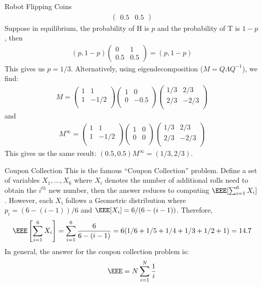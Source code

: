 \documentclass[oldfontcommands]{memoir}
\begin{document}
{\begin{answer}{Robot Flipping Coins}
\begin{align*}
\begin{pmatrix}
        0.5 & 0.5
    \end{pmatrix}	
\end{align*}
Suppose in equilibrium, the probability of H is $p$ and the probability of T is $1-p$, then
\begin{align*}
    (p, 1-p) 
    \begin{pmatrix}
        0 & 1\\
        0.5 & 0.5
    \end{pmatrix}
    =
    (p, 1-p)
\end{align*}
This gives us $p = 1/3$. Alternatively, using eigendecomposition ($M = Q \Lambda Q^{-1}$), we find:
\begin{align*}
    M = 
    \begin{pmatrix}
    1 & 1\\
    1 & -1/2\\		
    \end{pmatrix}
    \begin{pmatrix}
    1 & 0\\
    0 & -0.5\\		
    \end{pmatrix}
    \begin{pmatrix}
    1/3 & 2/3\\
    2/3 & -2/3\\		
    \end{pmatrix}
\end{align*}
and 
\begin{align*}
    M^\infty = 
    \begin{pmatrix}
    1 & 1\\
    1 & -1/2\\		
    \end{pmatrix}
    \begin{pmatrix}
    1 & 0\\
    0 & 0\\		
    \end{pmatrix}
    \begin{pmatrix}
    1/3 & 2/3\\
    2/3 & -2/3\\		
    \end{pmatrix}
\end{align*}
This gives us the same result: $(0.5, 0.5) M^\infty = (1/3, 2/3)$.\end{answer}
\begin{answer}{Coupon Collection}
This is the famous ``Coupon Collection'' problem. Define a set of variables $X_1, \dots, X_6$ where $X_i$ denotes the number of additional rolls need to obtain the $i^{th}$ new number, then the answer reduces to computing $\EEE[\sum_{i=1}^6 X_i]$. However, each $X_i$ follows a Geometric distribution where $p_i = (6 - (i-1)) / 6$ and $\EEE[X_i] = 6 / (6 - (i-1))$. Therefore,
\begin{align*}
    \EEE\left[\sum_{i=1}^6 X_i\right] = \sum_{i=1}^6 \frac{6}{6- (i-1)} = 6(1/6 + 1/5 + 1/4 + 1/3 + 1/2 + 1) = 14.7
\end{align*}
In general, the answer for the coupon collection problem is:
\begin{align*}
\EEE = N\sum_{i=1}^N \frac{1}{i}
\end{align*}


\end{answer}}
\end{document}
